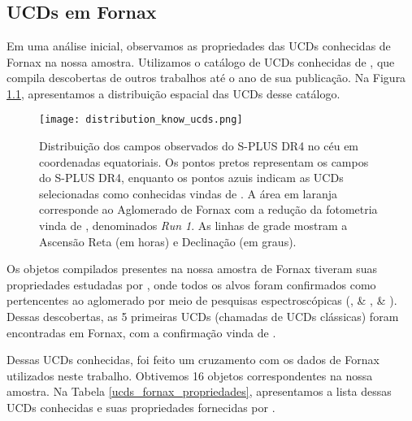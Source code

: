 \chapter{\chapternameanalysis}\label{analise}

\section{UCDs em Fornax}\label{sec:ucds_fornax}
Em uma análise inicial, observamos as propriedades das UCDs conhecidas de Fornax na nossa amostra. Utilizamos o catálogo de UCDs conhecidas de \cite{catalog_ucds}, que compila descobertas de outros trabalhos até o ano de sua publicação. Na Figura \ref{distribution_know_ucds}, apresentamos a distribuição espacial das UCDs desse catálogo.

\begin{figure}[!ht]
    \centering
    \texttt{[image: distribution\_know\_ucds.png]}
    \caption[]{Distribuição dos campos observados do S-PLUS DR4 no céu em coordenadas equatoriais. Os pontos pretos representam os campos do S-PLUS DR4, enquanto os pontos azuis indicam as UCDs selecionadas como conhecidas vindas de \cite{catalog_ucds}. A área em laranja corresponde ao Aglomerado de Fornax com a redução da fotometria vinda de \cite{haack2024splusfornaxprojectsfp}, denominados \textit{Run 1}. As linhas de grade mostram a Ascensão Reta (em horas) e Declinação (em graus).}
    \label{distribution_know_ucds}
\end{figure}

Os objetos compilados presentes na nossa amostra de Fornax tiveram suas propriedades estudadas por \cite{Mieske_2008_2}, onde todos os alvos foram confirmados como pertencentes ao aglomerado por meio de pesquisas espectroscópicas (\citealt{Drinkwater_2000}, \citealt{Mieske_2002} \& \citeyear{Mieske_2004}, \citealt{Richtler_2004} \& \citeyear{Richtler_2008}). Dessas descobertas, as 5 primeiras UCDs (chamadas de UCDs clássicas) foram encontradas em Fornax, com a confirmação vinda de \cite{Drinkwater_2000}.

Dessas UCDs conhecidas, foi feito um cruzamento com os dados de Fornax utilizados neste trabalho. Obtivemos 16 objetos correspondentes na nossa amostra. Na Tabela \ref{ucds_fornax_propriedades}, apresentamos a lista dessas UCDs conhecidas e suas propriedades fornecidas por \citealt{Mieske_2008_2}.

